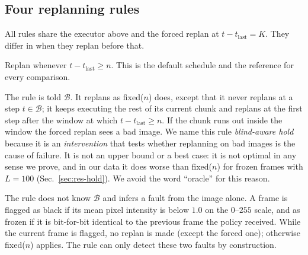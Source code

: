 \documentclass[11pt]{article}
\newcommand{\hold}{\textsf{hold}\xspace}
\newcommand{\fixed}{\textsf{fixed}\xspace}
\newcommand{\detect}{\textsf{detect}\xspace}
\begin{document}
\subsection{Four replanning rules}
\label{sec:rules}
All rules share the executor above and the forced replan at $t-t_{\mathrm{last}}=K$. They differ in when they replan before that.
\begin{description}\itemsep2pt
  \item[\fixed($n$).] Replan whenever $t-t_{\mathrm{last}}\ge n$. This is the default schedule and the reference for every comparison.
  \item[Blind-aware hold \hold($n$).] The rule is told $\mathcal B$. It replans as \fixed($n$) does, except that it never replans at a step $t\in\mathcal B$; it keeps executing the rest of its current chunk and replans at the first step after the window at which $t-t_{\mathrm{last}}\ge n$. If the chunk runs out inside the window the forced replan sees a bad image. We name this rule \emph{blind-aware hold} because it is an \emph{intervention} that tests whether replanning on bad images is the cause of failure. It is not an upper bound or a best case: it is not optimal in any sense we prove, and in our data it does worse than \fixed($n$) for frozen frames with $L{=}100$ (Sec.~\ref{sec:res-hold}). We avoid the word ``oracle'' for this reason.
  \item[Image-statistics \detect($n$).] The rule does not know $\mathcal B$ and infers a fault from the image alone. A frame is flagged as black if its mean pixel intensity is below $1.0$ on the $0$--$255$ scale, and as frozen if it is bit-for-bit identical to the previous frame the policy received. While the current frame is flagged, no replan is made (except the forced one); otherwise \fixed($n$) applies. The rule can only detect these two faults by construction.

\end{description}
\end{document}
